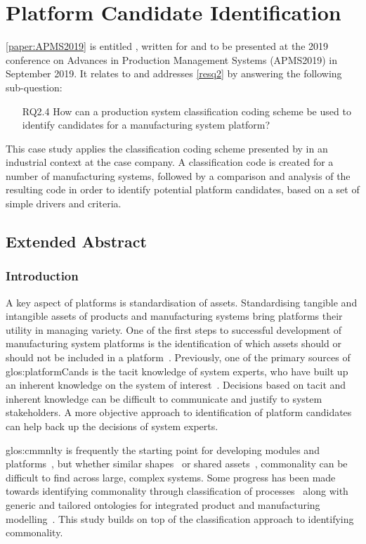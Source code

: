 \section{Platform Candidate Identification}\label{sec:pltfID}
\cref{paper:APMS2019} is entitled , written for and to be presented at the 2019 conference on Advances in Production Management Systems (APMS2019) in September 2019.
It relates to and addresses \cref{resq2} by answering the following sub-question:
\begin{enumerate}[leftmargin=3em]
  \item[RQ2.4] How can a production system classification coding scheme be used to identify candidates for a manufacturing system platform?
\end{enumerate}
This case study applies the classification coding scheme presented by \textcite{SorensenClsfCoding} in an industrial context at the case company.
A classification code is created for a number of manufacturing systems, followed by a comparison and analysis of the resulting code in order to identify potential platform candidates, based on a set of simple drivers and criteria.

\subsection{Extended Abstract}
\subsubsection*{Introduction}
A key aspect of platforms is standardisation of assets.
Standardising tangible and intangible assets of products and manufacturing systems bring platforms their utility in managing variety.
One of the first steps to successful development of manufacturing system platforms is the identification of which assets should or should not be included in a platform~\parencite{SorensenCMS2019}.
Previously, one of the primary sources of \gls{glos:platformCand}s is the tacit knowledge of system experts, who have built up an inherent knowledge on the system of interest~\parencite{SorensenAPMS2018}.
Decisions based on tacit and inherent knowledge can be difficult to communicate and justify to system stakeholders.
A more objective approach to identification of platform candidates can help back up the decisions of system experts.

\Gls{glos:cmmnlty} is frequently the starting point for developing modules and platforms~\parencite{Thevenot2006,Fixson01062007}, but whether similar shapes~\parencite{Cardone2003} or shared assets~\parencite{Kashkoush20161}, commonality can be difficult to find across large, complex systems.
Some progress has been made towards identifying commonality through classification of processes~\parencite{SorensenCMS2018} along with generic and tailored ontologies for integrated product and manufacturing modelling~\parencite{BRUNOE2018592}.
This study builds on top of the classification approach to identifying commonality. 

